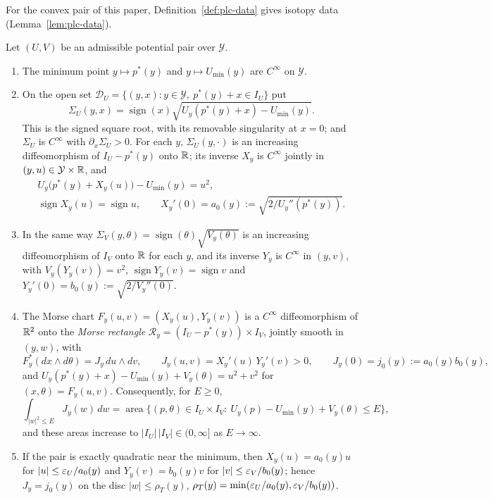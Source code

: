 For the convex pair of this paper, Definition~\ref{def:plc-data} gives isotopy data (Lemma~\ref{lem:plc-data}).

\begin{lemma}\label{I:lem:pln-morse-inverse}
Let $(U,V)$ be an admissible potential pair over $\mathcal Y$.
\begin{enumerate}[label=(\roman*)]
\item The minimum point $y\mapsto p^*(y)$ and $y\mapsto U_{\min}(y)$ are $C^\infty$ on $\mathcal Y$.
\item On the open set $\mathcal D_U=\{(y,x):y\in\mathcal Y,\ p^*(y)+x\in I_U\}$ put
 \[
  \Sigma_U(y,x)=\operatorname{sign}(x)\sqrt{U_y(p^*(y)+x)-U_{\min}(y)}.
 \]
 This is the signed square root, with its removable singularity at $x=0$; and $\Sigma_U$ is $C^\infty$ with
 $\partial_x\Sigma_U>0$. For each $y$, $\Sigma_U(y,\cdot)$ is an increasing diffeomorphism of
 $I_U-p^*(y)$ onto $\mathbb{R}$; its inverse $X_y$ is $C^\infty$ jointly in $(y,u)\in\mathcal Y\times\mathbb{R}$, and
 \begin{gather*}
  U_y\bigl(p^*(y)+X_y(u)\bigr)-U_{\min}(y)=u^2,\\
  \operatorname{sign}X_y(u)=\operatorname{sign}u,\qquad
  X_y'(0)=a_0(y):=\sqrt{2/U_y''(p^*(y))} .
 \end{gather*}
\item In the same way $\Sigma_V(y,\theta)=\operatorname{sign}(\theta)\sqrt{V_y(\theta)}$
 is an increasing diffeomorphism of $I_V$ onto $\mathbb{R}$ for each $y$, and its inverse $Y_y$ is $C^\infty$ in
 $(y,v)$, with $V_y(Y_y(v))=v^2$, $\operatorname{sign}Y_y(v)=\operatorname{sign}v$ and
 $Y_y'(0)=b_0(y):=\sqrt{2/V_y''(0)}$.
\item The Morse chart $F_y(u,v)=(X_y(u),Y_y(v))$ is a $C^\infty$ diffeomorphism of $\mathbb{R}^2$ onto the
 \emph{Morse rectangle} $\mathcal R_y=(I_U-p^*(y))\times I_V$, jointly smooth in $(y,w)$, with
 \[
  F_y^*(dx\wedge d\theta)=J_y\,du\wedge dv,\qquad J_y(u,v)=X_y'(u)\,Y_y'(v)>0,\qquad J_y(0)=j_0(y):=a_0(y)b_0(y),
 \]
 and $U_y(p^*(y)+x)-U_{\min}(y)+V_y(\theta)=u^2+v^2$ for $(x,\theta)=F_y(u,v)$. Consequently, for $E\ge0$,
 \[
  \int_{|w|^2\le E}J_y(w)\,dw=\operatorname{area}\bigl\{(p,\theta)\in I_U\times I_V:\ U_y(p)-U_{\min}(y)+V_y(\theta)\le E\bigr\},
 \]
 and these areas increase to $|I_U|\,|I_V|\in(0,\infty]$ as $E\to\infty$.
\item If the pair is exactly quadratic near the minimum, then $X_y(u)=a_0(y)u$ for $|u|\le\varepsilon_U/a_0(y)$
 and $Y_y(v)=b_0(y)v$ for $|v|\le\varepsilon_V/b_0(y)$; hence $J_y=j_0(y)$ on the disc $|w|\le\rho_T(y)$,
 $\rho_T(y)=\min(\varepsilon_U/a_0(y),\varepsilon_V/b_0(y))$.
\end{enumerate}
\end{lemma}

